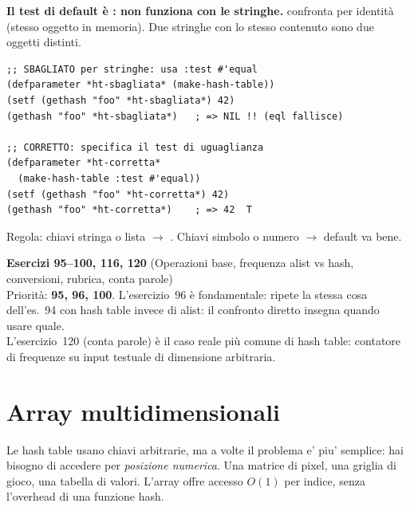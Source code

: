 

\begin{attenzione}
\textbf{Il test di default è : non funziona con le stringhe.}
 confronta per identità (stesso oggetto in memoria).
Due stringhe con lo stesso contenuto sono due oggetti distinti.

\begin{lstlisting}
;; SBAGLIATO per stringhe: usa :test #'equal
(defparameter *ht-sbagliata* (make-hash-table))
(setf (gethash "foo" *ht-sbagliata*) 42)
(gethash "foo" *ht-sbagliata*)   ; => NIL !! (eql fallisce)

;; CORRETTO: specifica il test di uguaglianza
(defparameter *ht-corretta*
  (make-hash-table :test #'equal))
(setf (gethash "foo" *ht-corretta*) 42)
(gethash "foo" *ht-corretta*)    ; => 42  T
\end{lstlisting}

Regola: chiavi stringa o lista $\to$ .
Chiavi simbolo o numero $\to$ default  va bene.
\end{attenzione}

\begin{workbook}
\textbf{Esercizi 95--100, 116, 120}
(Operazioni base, frequenza alist vs hash, conversioni,
rubrica, conta parole)\\[4pt]
Priorità: \textbf{95, 96, 100}.
L'esercizio~96 è fondamentale: ripete la stessa cosa dell'es.~94
con hash table invece di alist: il confronto diretto insegna
quando usare quale.\\[4pt]
L'esercizio~120 (conta parole) è il caso reale più comune di hash table:
contatore di frequenze su input testuale di dimensione arbitraria.
\end{workbook}

\section{Array multidimensionali}

Le hash table usano chiavi arbitrarie, ma a volte il problema
e' piu' semplice: hai bisogno di accedere per \emph{posizione numerica}.
Una matrice di pixel, una griglia di gioco, una tabella di valori.
L'array offre accesso $O(1)$ per indice, senza l'overhead di una
funzione hash.

